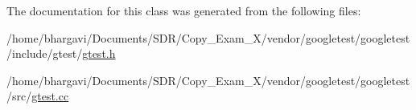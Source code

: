 The documentation for this class was generated from the following files\+:\begin{DoxyCompactItemize}
\item 
/home/bhargavi/\+Documents/\+S\+D\+R/\+Copy\+\_\+\+Exam\+\_\+X/vendor/googletest/googletest/include/gtest/\hyperlink{gtest_8h}{gtest.\+h}\item 
/home/bhargavi/\+Documents/\+S\+D\+R/\+Copy\+\_\+\+Exam\+\_\+X/vendor/googletest/googletest/src/\hyperlink{gtest_8cc}{gtest.\+cc}\end{DoxyCompactItemize}
